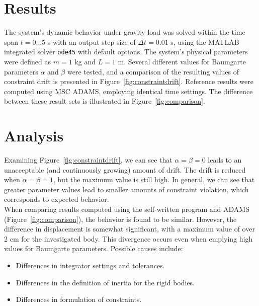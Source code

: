 \documentclass{article}
\begin{document}
\section*{Results}
The system's dynamic behavior under gravity load was solved within the time span $t = 0 \dots 5$ s with an output step size of $\Delta t = 0.01$ s, using the MATLAB integrated solver \texttt{ode45} with default options. The system's physical parameters were defined as $m = 1$ kg and $L = 1$ m. Several different values for Baumgarte parameters $\alpha$ and $\beta$ were tested, and a comparison of the resulting values of constraint drift is presented in Figure~\ref*{fig:constraintdrift}. Reference results were computed using MSC ADAMS, employing identical time settings. The difference between these result sets is illustrated in Figure~\ref*{fig:comparison}.


\section*{Analysis}
Examining Figure~\ref*{fig:constraintdrift}, we can see that $\alpha = \beta = 0$ leads to an unacceptable (and continuously growing) amount of drift. The drift is reduced when $\alpha = \beta = 1$, but the maximum value is still high. In general, we can see that greater parameter values lead to smaller amounts of constraint violation, which corresponds to expected behavior.\\

When comparing results computed using the self-written program and ADAMS (Figure~\ref*{fig:comparison}), the behavior is found to be similar. However, the difference in displacement is somewhat significant, with a maximum value of over 2 cm for the investigated body. This divergence occurs even when emplying high values for Baumgarte parameters. Possible causes include:
\begin{itemize}
	\setlength\itemsep{0pt}
	\item Differences in integrator settings and tolerances.
	\item Differences in the definition of inertia for the rigid bodies.
	\item Differences in formulation of constraints.
\end{itemize}
\end{document}
